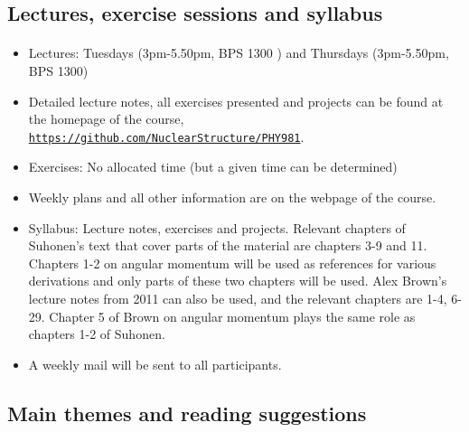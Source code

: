 \documentclass[%
twoside,                 %
final,                   %
10pt]{article}
\begin{document}
\subsection*{Lectures, exercise sessions and syllabus}

\paragraph{}
\begin{itemize}
\item Lectures: Tuesdays (3pm-5.50pm, BPS 1300 ) and Thursdays (3pm-5.50pm, BPS 1300)

\item Detailed lecture notes, all exercises presented and projects can be found at the homepage of the course, \href{{https://github.com/NuclearStructure/PHY981}}{\nolinkurl{https://github.com/NuclearStructure/PHY981}}.

\item Exercises: No allocated time (but a given time can be determined)

\item Weekly plans and all other information are on the webpage of the course.

\item Syllabus: Lecture notes, exercises and projects. Relevant chapters of Suhonen's text that cover parts of the material are chapters 3-9 and 11. Chapters 1-2 on angular momentum will be used as references for various derivations and only parts of these two chapters will be used. Alex Brown's lecture notes from 2011 can also be used, and the relevant chapters are 1-4, 6-29. Chapter 5 of Brown on angular momentum plays the same role as chapters 1-2 of Suhonen. 

\item A weekly mail will be sent to all participants. 
\end{itemize}

\noindent




\subsection*{Main themes and reading suggestions}

\end{document}
